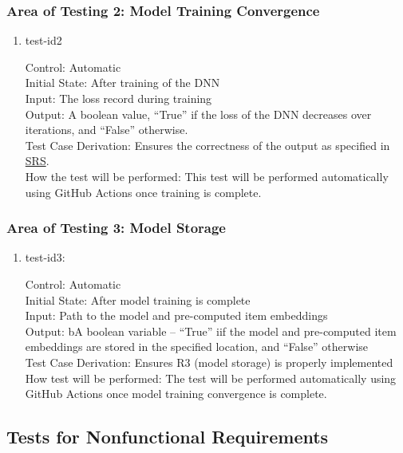 \documentclass[12pt, titlepage]{article}
\begin{document}
\subsubsection{Area of Testing 2: Model Training Convergence}

\begin{enumerate}
  \item{test-id2\\}

  Control: Automatic\\
  Initial State: After training of the DNN\\
  Input: The loss record during training\\
  Output: A boolean value, ``True'' if the loss of the DNN decreases over iterations, and ``False'' otherwise.\\
  Test Case Derivation: Ensures the correctness of the output as specified in \href{https://github.com/V-AS/Two-tower-recommender-system/blob/main/docs/SRS/SRS.pdf}{SRS}.\\
  How the test will be performed: This test will be performed automatically using GitHub Actions once training is complete.

\end{enumerate}

\subsubsection{Area of Testing 3: Model Storage}

\begin{enumerate}
  \item{test-id3:\\}
  
  Control: Automatic\\
  Initial State: After model training is complete\\
  Input: Path to the model and pre-computed item embeddings\\
  Output: bA boolean variable -- ``True'' iif the model and pre-computed item embeddings are stored in the specified location, and ``False'' otherwise\\
  Test Case Derivation: Ensures R3 (model storage) is properly implemented\\
  How test will be performed: The test will be performed automatically using GitHub Actions once model training convergence is complete.
\end{enumerate}


\subsection{Tests for Nonfunctional Requirements}
\end{document}
